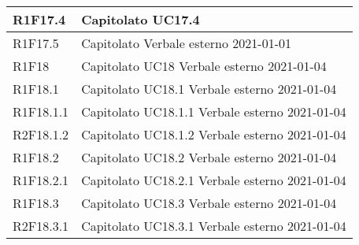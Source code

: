 \begin{center}
\begin{longtable}{|p{22mm}|p{22mm}|}
R1F17.4 &
Capitolato \newline
UC17.4 \newline
\\
\hline

R1F17.5 &
Capitolato \newline
Verbale esterno 2021-01-01 \newline
\\
\hline

R1F18 &
Capitolato \newline
UC18 \newline
Verbale esterno 2021-01-04 \newline
\\
\hline

R1F18.1 &
Capitolato \newline
UC18.1 \newline
Verbale esterno 2021-01-04 \newline
\\
\hline

R1F18.1.1 &
Capitolato \newline
UC18.1.1 \newline
Verbale esterno 2021-01-04 \newline
\\
\hline

R2F18.1.2 &
Capitolato \newline
UC18.1.2 \newline
Verbale esterno 2021-01-04 \newline
\\
\hline

R1F18.2 &
Capitolato \newline
UC18.2 \newline
Verbale esterno 2021-01-04 \newline
\\
\hline

R1F18.2.1 &
Capitolato \newline
UC18.2.1 \newline
Verbale esterno 2021-01-04 \newline
\\
\hline

R1F18.3 &
Capitolato \newline
UC18.3 \newline
Verbale esterno 2021-01-04 \newline
\\
\hline

R2F18.3.1 &
Capitolato \newline
UC18.3.1 \newline
Verbale esterno 2021-01-04 \newline
\\
\hline


\end{longtable}
\end{center}

